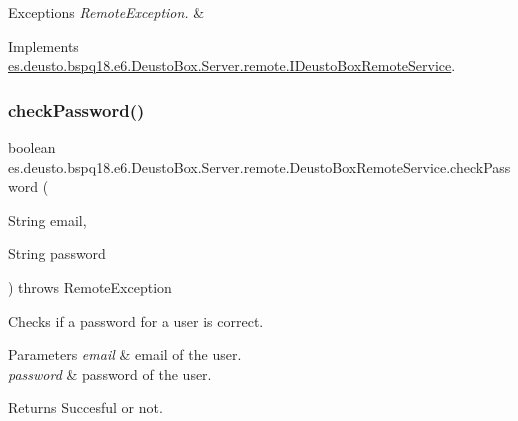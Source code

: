 \begin{DoxyExceptions}{Exceptions}
{\em Remote\+Exception.} & \\
\hline
\end{DoxyExceptions}


Implements \mbox{\hyperlink{interfacees_1_1deusto_1_1bspq18_1_1e6_1_1_deusto_box_1_1_server_1_1remote_1_1_i_deusto_box_remote_service_a0915371c764b75738220b50a702335ad}{es.\+deusto.\+bspq18.\+e6.\+Deusto\+Box.\+Server.\+remote.\+I\+Deusto\+Box\+Remote\+Service}}.

\mbox{\label{classes_1_1deusto_1_1bspq18_1_1e6_1_1_deusto_box_1_1_server_1_1remote_1_1_deusto_box_remote_service_a5554ad18e8eeaaba4cd51e598c5b6114}} 
\subsubsection{\texorpdfstring{check\+Password()}{checkPassword()}}
{\footnotesize\ttfamily boolean es.\+deusto.\+bspq18.\+e6.\+Deusto\+Box.\+Server.\+remote.\+Deusto\+Box\+Remote\+Service.\+check\+Password (\begin{DoxyParamCaption}\item[{String}]{email,  }\item[{String}]{password }\end{DoxyParamCaption}) throws Remote\+Exception}

Checks if a password for a user is correct.


\begin{DoxyParams}{Parameters}
{\em email} & email of the user. \\
\hline
{\em password} & password of the user. \\
\hline
\end{DoxyParams}
\begin{DoxyReturn}{Returns}
Succesful or not. 
\end{DoxyReturn}


